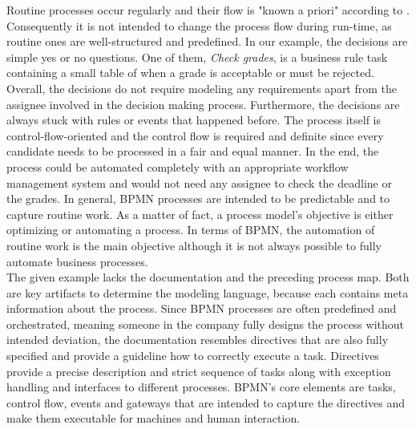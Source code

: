 Routine processes occur regularly and their flow is "known a priori" according to \cite{Zeising_2014}. Consequently it is not intended to change the process flow during run-time, as routine ones are well-structured and predefined.\newpage
In our example, the decisions are simple yes or no questions. One of them, \textit{Check grades}, is a business rule task containing a small table of when a grade is acceptable or must be rejected. Overall, the decisions do not require modeling any requirements apart from the assignee involved in the decision making process. Furthermore, the decisions are always stuck with rules or events that happened before. The process itself is control-flow-oriented and the control flow is required and definite since every candidate needs to be processed in a fair and equal manner. In the end, the process could be automated completely with an appropriate workflow management system and would not need any assignee to check the deadline or the grades. In general, BPMN processes are intended to be predictable and to capture routine work. As a matter of fact, a process model's objective is either optimizing or automating a process. In terms of BPMN, the automation of routine work is the main objective although it is not always possible to fully automate business processes. \enlargethispage{1\baselineskip} \\
The given example lacks the documentation and the preceding process map. Both are key artifacts to determine the modeling language, because each contains meta information about the process. Since BPMN processes are often predefined and orchestrated, meaning someone in the company fully designs the process without intended deviation, the documentation resembles directives that are also fully specified and provide a guideline how to correctly execute a task. Directives provide a precise description and strict sequence of tasks along with exception handling and interfaces to different processes. BPMN's core elements are tasks, control flow, events and gateways that are intended to capture the directives and make them executable for machines and human interaction. \enlargethispage{1\baselineskip} \\
